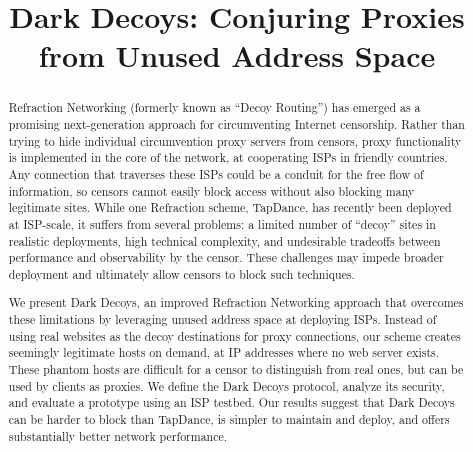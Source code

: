 \documentclass[letterpaper,twocolumn,10pt]{article}
\begin{document}
\date{}

\title{\Large \bf Dark Decoys:
  Conjuring Proxies from Unused Address Space}


\maketitle

\newcommand{\scheme}{Dark Decoys\xspace}

\begin{abstract}
Refraction Networking (formerly known as ``Decoy Routing'') has
emerged as a promising next-generation approach for circumventing
Internet censorship. Rather than trying to hide individual
circumvention proxy servers from censors, proxy functionality is
implemented in the core of the network, at cooperating ISPs in
friendly countries.  Any connection that traverses these ISPs could be
a conduit for the free flow of information, so censors cannot easily
block access without also blocking many legitimate sites.  While one
Refraction scheme, TapDance, has recently been deployed at ISP-scale,
it suffers from several problems: a limited number of ``decoy'' sites
in realistic deployments, high technical complexity, and undesirable
tradeoffs between performance and observability by the censor. These
challenges may impede broader deployment and ultimately allow censors to
block such techniques.

We present \scheme, an improved Refraction Networking approach
that overcomes these limitations by leveraging unused address space at
deploying ISPs. Instead of using real websites as the decoy destinations
for proxy connections, our scheme creates seemingly legitimate hosts
on demand, at IP addresses where no web server exists.
These phantom hosts are difficult for a censor to distinguish from
real ones, but can be used by clients as proxies.  We define the
\scheme protocol, analyze its security, and evaluate a
prototype using an ISP testbed.
Our results suggest that \scheme can be harder to block
than TapDance, is simpler to maintain and deploy,
and offers substantially better network performance.

\end{abstract}
\end{document}
